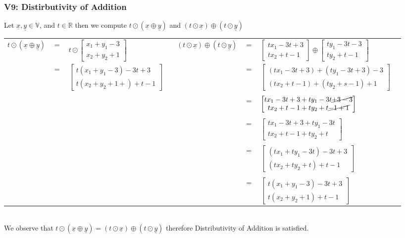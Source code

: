 \documentclass{article}
\begin{document}
\subsubsection*{V9: Distirbutivity of Addition}
Let $\underline{x},\underline{y}\in\mathbb{V}$, and $t\in\mathbb{R}$ then we compute $t\odot(\underline{x}\oplus\underline{y})$ and $(t\odot\underline{x})\oplus(t\odot\underline{y})$
\begin{table}[htp]
\centering
\begin{tabular}{cclc|cclc}
  $t\odot(\underline{x}\oplus\underline{y})$ & $=$  & $t\odot\begin{bmatrix} x_{1}+y_{1}-3\\x_{2}+y_{2}+1\end{bmatrix}$  &   & $(t\odot\underline{x})\oplus(t\odot\underline{y})$  & $=$  & $\begin{bmatrix} tx_{1}-3t+3\\tx_{2}+t-1\end{bmatrix}\oplus\begin{bmatrix} ty_{1}-3t-3\\ty_{2}+t-1\end{bmatrix}$  &   \\
   & $=$  & $\begin{bmatrix} t(x_{1}+y_{1}-3)-3t+3\\t(x_{2}+y_{2}+1+)+t-1\end{bmatrix}$  &   &   & $=$  & $\begin{bmatrix} (tx_{1}-3t+3)+(ty_{1}-3t+3)-3\\(tx_{2}+t-1)+(ty_{2}+s-1)+1\end{bmatrix}$  &   \\
   &&&&&&&\\
   &   &   &   &   &  $=$ & $\begin{bmatrix} tx_{1}-3t+3+ty_{1}-3t\cancel{+3-3}\\tx_{2}+t-1+ty_{2}+t\cancel{-1+1}\end{bmatrix}$  &   \\
   &&&&&&&\\
   &   &   &   &   &  $=$ & $\begin{bmatrix} tx_{1}-3t+3+ty_{1}-3t\\tx_{2}+t-1+ty_{2}+t\end{bmatrix}$  &   \\
   &&&&&&&\\
   &   &   &   &   &  $=$ & $\begin{bmatrix} (tx_{1}+ty_{1}-3t)-3t+3\\(tx_{2}+ty_{2}+t)+t-1\end{bmatrix}$ &  \\
   &&&&&&&\\
   &   &   &   &   &  $=$ & $\begin{bmatrix} t(x_{1}+y_{1}-3)-3t+3\\t(x_{2}+y_{2}+1)+t-1\end{bmatrix}$ &  \\
\end{tabular}
\end{table}\\
We observe that $t\odot(\underline{x}\oplus\underline{y}) = (t\odot\underline{x})\oplus(t\odot\underline{y})$ therefore Distributivity of Addition is satisfied.
\newpage
\end{document}
